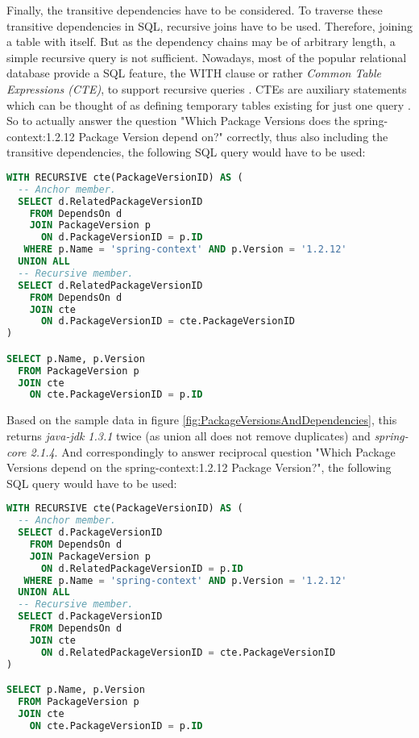 Finally, the transitive dependencies have to be considered. To traverse these transitive dependencies in SQL, recursive joins have to be used. Therefore, joining a table with itself. But as the dependency chains may be of arbitrary length, a simple recursive query is not sufficient. Nowadays, most of the popular relational database provide a SQL feature, the WITH clause or rather \emph{Common Table Expressions (CTE)}, to support recursive queries \cite{mysqlCTE, postgresCTE, sqliteCTE}. CTEs are auxiliary statements which can be thought of as defining temporary tables existing for just one query \cite{postgresCTE}. So to actually answer the question "Which Package Versions does the spring-context:1.2.12 Package Version depend on?" correctly, thus also including the transitive dependencies, the following SQL query would have to be used:

\begin{lstlisting}[language=SQL, caption=Package Version Dependencies (including transitive), captionpos=b, label=lst:PackageVersionDependenciesIncTransitive]
WITH RECURSIVE cte(PackageVersionID) AS (
  -- Anchor member.
  SELECT d.RelatedPackageVersionID
    FROM DependsOn d
    JOIN PackageVersion p
      ON d.PackageVersionID = p.ID
   WHERE p.Name = 'spring-context' AND p.Version = '1.2.12'
  UNION ALL
  -- Recursive member.
  SELECT d.RelatedPackageVersionID
    FROM DependsOn d
    JOIN cte
      ON d.PackageVersionID = cte.PackageVersionID
)

SELECT p.Name, p.Version
  FROM PackageVersion p
  JOIN cte
    ON cte.PackageVersionID = p.ID
\end{lstlisting}

Based on the sample data in figure \ref{fig:PackageVersionsAndDependencies}, this returns \emph{java-jdk 1.3.1} twice (as union all does not remove duplicates) and \emph{spring-core 2.1.4}. And correspondingly to answer reciprocal question "Which Package Versions depend on the spring-context:1.2.12 Package Version?", the following SQL query would have to be used:

\begin{lstlisting}[language=SQL, caption=Package Version Reciprocal Dependencies (including transitive), captionpos=b, label=lst:PackageVersionReciprocalDependenciesIncTransitive]
WITH RECURSIVE cte(PackageVersionID) AS (
  -- Anchor member.
  SELECT d.PackageVersionID
    FROM DependsOn d
    JOIN PackageVersion p
      ON d.RelatedPackageVersionID = p.ID
   WHERE p.Name = 'spring-context' AND p.Version = '1.2.12'
  UNION ALL
  -- Recursive member.
  SELECT d.PackageVersionID
    FROM DependsOn d
    JOIN cte
      ON d.RelatedPackageVersionID = cte.PackageVersionID
)

SELECT p.Name, p.Version
  FROM PackageVersion p
  JOIN cte
    ON cte.PackageVersionID = p.ID
\end{lstlisting}

